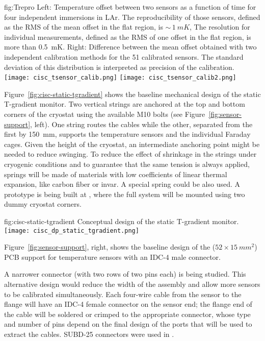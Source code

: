\begin{dunefigure}{fig:Trepro}{
 Left:   Temperature offset between two sensors as a function of time for four independent immersions in LAr. The reproducibility of those sensors, defined as the RMS of the mean offset in the flat region, is $\sim\,\SI{1}{mK}$,
    The resolution for individual measurements, defined as the RMS of one offset in the flat region, is more than \SI{0.5}{mK}. Right: Difference between the mean offset obtained with two independent calibration methods for the 51 calibrated sensors. The standard deviation of this distribution is interpreted as precision of the calibration.}
  \texttt{[image: cisc\_tsensor\_calib.png]}%
  \texttt{[image: cisc\_tsensor\_calib2.png]}%
\end{dunefigure}



Figure~\ref{fig:cisc-static-tgradient} shows the baseline mechanical design of
the static T-gradient monitor. Two vertical strings are anchored at the top and bottom corners of the cryostat
using the available M10 bolts (see Figure~\ref{fig:sensor-support}, left). One string routes the cables while the other,
separated from the first by \SI{150}{mm},  supports the temperature sensors and the individual Faraday cages. 
Given the height of the cryostat, an intermediate anchoring point might be needed to reduce swinging. To reduce the effect of shrinkage in the strings under cryogenic conditions and to guarantee that the same tension is always applied, springs will be made of materials with low coefficients of linear thermal expansion, like carbon fiber or invar. A special spring could be also used. A prototype is being built at , where the full system will be mounted using two dummy cryostat corners.  
\begin{dunefigure}
{fig:cisc-static-tgradient}
  {Conceptual design of the static T-gradient monitor.}
  \texttt{[image: cisc\_dp\_static\_tgradient.png]}
\end{dunefigure}


Figure~\ref{fig:sensor-support}, right, shows the baseline design of the ($52\times \SI{15}{mm^2}$) 
PCB support for temperature sensors with an IDC-4 male connector. %

A narrower connector (with two rows of two pins each) is being studied. This alternative design would reduce the width of the  assembly and allow more sensors to be calibrated simultaneously. Each four-wire cable from the sensor to the flange will have an IDC-4 female connector on the sensor end; the flange end of the cable will be soldered or crimped to the appropriate connector, whose type and number of pins  depend on the final design of the  ports that will be used to extract the cables. SUBD-25 connectors were used in .


